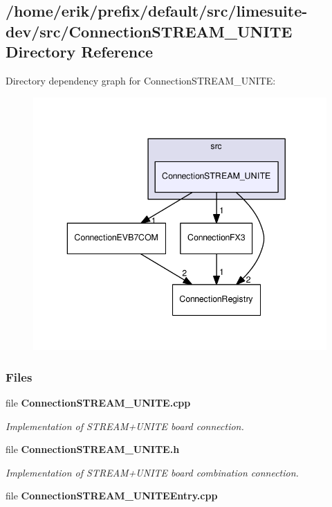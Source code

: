 \subsection{/home/erik/prefix/default/src/limesuite-\/dev/src/\+Connection\+S\+T\+R\+E\+A\+M\+\_\+\+U\+N\+I\+TE Directory Reference}
\label{dir_946dc8f27459333fe04d7c5527a58604}
Directory dependency graph for Connection\+S\+T\+R\+E\+A\+M\+\_\+\+U\+N\+I\+TE\+:
\nopagebreak
\begin{figure}[H]
\begin{center}
\leavevmode
\includegraphics[width=343pt]{dir_946dc8f27459333fe04d7c5527a58604_dep}
\end{center}
\end{figure}
\subsubsection*{Files}
\begin{DoxyCompactItemize}
\item 
file {\bf Connection\+S\+T\+R\+E\+A\+M\+\_\+\+U\+N\+I\+T\+E.\+cpp}
\begin{DoxyCompactList}\small\item\em Implementation of S\+T\+R\+E\+A\+M+\+U\+N\+I\+TE board connection. \end{DoxyCompactList}\item 
file {\bf Connection\+S\+T\+R\+E\+A\+M\+\_\+\+U\+N\+I\+T\+E.\+h}
\begin{DoxyCompactList}\small\item\em Implementation of S\+T\+R\+E\+A\+M+\+U\+N\+I\+TE board combination connection. \end{DoxyCompactList}\item 
file {\bf Connection\+S\+T\+R\+E\+A\+M\+\_\+\+U\+N\+I\+T\+E\+Entry.\+cpp}
\end{DoxyCompactItemize}
